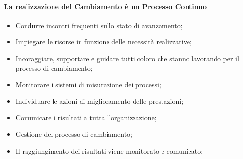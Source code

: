 \paragraph{La realizzazione del Cambiamento è un Processo Continuo}\label{par:bpr_la_realizzazione_del_cambiamento_un_processo_continuo} %
\begin{note}
    \begin{itemize}
        \item Condurre incontri frequenti sullo stato di avanzamento;
        \item Impiegare le risorse in funzione delle necessità realizzative;
        \item Incoraggiare, supportare e guidare tutti coloro che stanno lavorando per il processo di cambiamento;
        \item Monitorare i sistemi di misurazione dei processi;
        \item Individuare le azioni di miglioramento delle prestazioni;
        \item Comunicare i risultati a tutta l'organizzazione;
    \end{itemize}
\end{note}
\begin{note}[Risultato]
    \begin{itemize}
        \item Gestione del processo di cambiamento;
        \item Il raggiungimento dei risultati viene monitorato e comunicato;
    \end{itemize}
\end{note}
